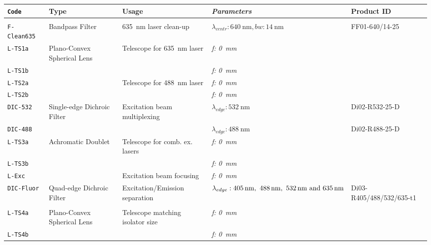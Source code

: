 \begin{table}
    \centering
    \begin{tabular}{>{\tt}l l l >{\it}l l}
    \toprule
         Code & Type & Usage & Parameters & Product ID\\
    \midrule
    \multicolumn{5}{l}{\it Fluorescence Excitation Path}\\
        F-Clean635
            & Bandpass Filter
            & \SI{635}{\nm} laser clean-up
            & $\lambda_{centr}: \SI{640}{\nm},
              bw: \SI{14}{\nm}$
            & FF01-640/14-25\\
        L-TS1a
            & Plano-Convex Spherical Lens
            & Telescope for \SI{635}{\nm} laser
            & f: \SI{0}{\mm}
            & \\
        L-TS1b
            & & 
            & f: \SI{0}{\mm}
            & \\
        L-TS2a
            & 
            & Telescope for \SI{488}{\nm} laser
            & f: \SI{0}{\mm}
            & \\
        L-TS2b
            & & 
            & f: \SI{0}{\mm}
            & \\
        DIC-532
            & Single-edge Dichroic Filter
            & Excitation beam multiplexing
            & $\lambda_{edge}: \SI{532}{\nm}$
            & Di02-R532-25-D\\
        DIC-488
            & &
            & $\lambda_{edge}: \SI{488}{\nm}$
            & Di02-R488-25-D\\
        L-TS3a
            & Achromatic Doublet
            & Telescope for comb. ex. lasers
            & f: \SI{0}{\mm}
            & \\
        L-TS3b
            & & 
            & f: \SI{0}{\mm}
            & \\
        L-Exc
            &
            & Excitation beam focusing
            & f: \SI{0}{\mm} 
            & \\
        DIC-Fluor
            & Quad-edge Dichroic Filter
            & Excitation/Emission separation
            & $\lambda_{edge}: \SIlist{405;488;532;635}{\nm}$
            & Di03-R405/488/532/635-t1 \\
    \multicolumn{5}{l}{\it Tweezers Path}\\
        L-TS4a
            & Plano-Convex Spherical Lens
            & Telescope matching isolator size
            & f: \SI{0}{\mm}
            & \\
        L-TS4b
            & & 
            & f: \SI{0}{\mm}

\end{tabular}
\end{table}
